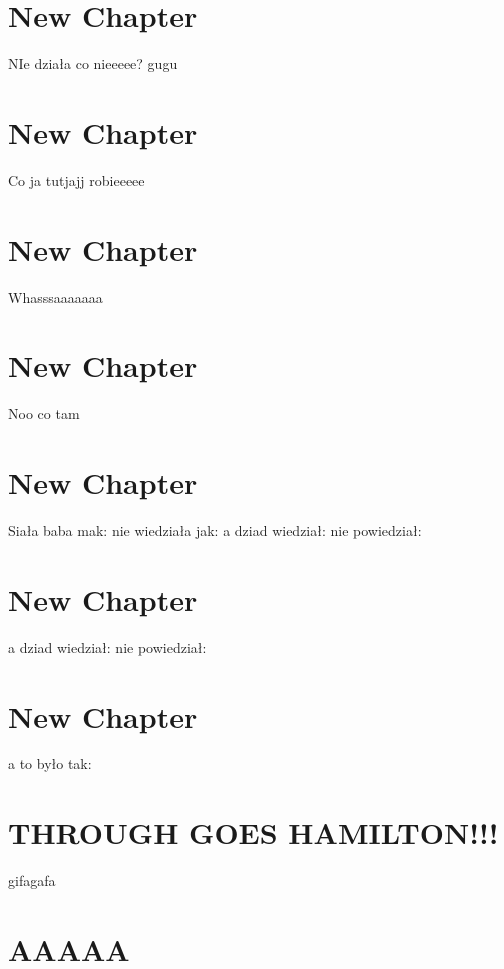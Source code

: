 \documentclass{article}
\begin{document}
\section{New Chapter}
NIe działa co nieeeee? gugu
\section{New Chapter}
Co ja tutjajj robieeeee
\section{New Chapter}
Whasssaaaaaaa
\section{New Chapter}
Noo co tam
\section{New Chapter}
Siała baba mak: nie wiedziała jak: a dziad wiedział: nie powiedział:
\section{New Chapter}
a dziad wiedział: nie powiedział:
\section{New Chapter}
a to było tak:



\section{THROUGH GOES HAMILTON!!!}
gifagafa
\section{AAAAA}
\end{document}
